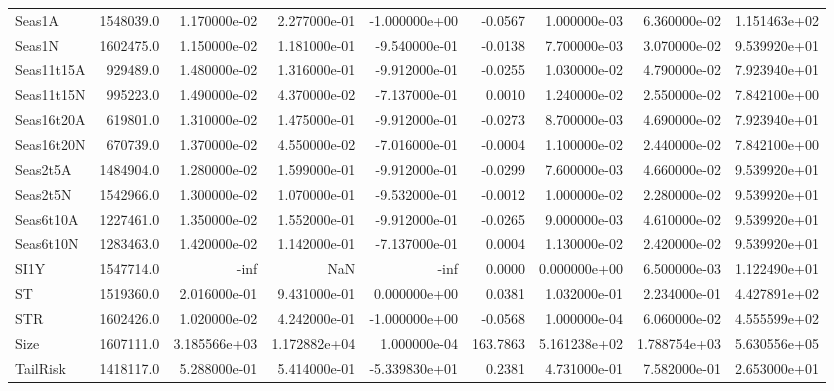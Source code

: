 \begin{tabular}{lrrrrrrrr}
Seas1A     &  1548039.0 &  1.170000e-02 &  2.277000e-01 & -1.000000e+00 &      -0.0567 &  1.000000e-03 &  6.360000e-02 &  1.151463e+02 \\
Seas1N     &  1602475.0 &  1.150000e-02 &  1.181000e-01 & -9.540000e-01 &      -0.0138 &  7.700000e-03 &  3.070000e-02 &  9.539920e+01 \\
Seas11t15A &   929489.0 &  1.480000e-02 &  1.316000e-01 & -9.912000e-01 &      -0.0255 &  1.030000e-02 &  4.790000e-02 &  7.923940e+01 \\
Seas11t15N &   995223.0 &  1.490000e-02 &  4.370000e-02 & -7.137000e-01 &       0.0010 &  1.240000e-02 &  2.550000e-02 &  7.842100e+00 \\
Seas16t20A &   619801.0 &  1.310000e-02 &  1.475000e-01 & -9.912000e-01 &      -0.0273 &  8.700000e-03 &  4.690000e-02 &  7.923940e+01 \\
Seas16t20N &   670739.0 &  1.370000e-02 &  4.550000e-02 & -7.016000e-01 &      -0.0004 &  1.100000e-02 &  2.440000e-02 &  7.842100e+00 \\
Seas2t5A   &  1484904.0 &  1.280000e-02 &  1.599000e-01 & -9.912000e-01 &      -0.0299 &  7.600000e-03 &  4.660000e-02 &  9.539920e+01 \\
Seas2t5N   &  1542966.0 &  1.300000e-02 &  1.070000e-01 & -9.532000e-01 &      -0.0012 &  1.000000e-02 &  2.280000e-02 &  9.539920e+01 \\
Seas6t10A  &  1227461.0 &  1.350000e-02 &  1.552000e-01 & -9.912000e-01 &      -0.0265 &  9.000000e-03 &  4.610000e-02 &  9.539920e+01 \\
Seas6t10N  &  1283463.0 &  1.420000e-02 &  1.142000e-01 & -7.137000e-01 &       0.0004 &  1.130000e-02 &  2.420000e-02 &  9.539920e+01 \\
SI1Y       &  1547714.0 &          -inf &           NaN &          -inf &       0.0000 &  0.000000e+00 &  6.500000e-03 &  1.122490e+01 \\
ST         &  1519360.0 &  2.016000e-01 &  9.431000e-01 &  0.000000e+00 &       0.0381 &  1.032000e-01 &  2.234000e-01 &  4.427891e+02 \\
STR        &  1602426.0 &  1.020000e-02 &  4.242000e-01 & -1.000000e+00 &      -0.0568 &  1.000000e-04 &  6.060000e-02 &  4.555599e+02 \\
Size       &  1607111.0 &  3.185566e+03 &  1.172882e+04 &  1.000000e-04 &     163.7863 &  5.161238e+02 &  1.788754e+03 &  5.630556e+05 \\
TailRisk   &  1418117.0 &  5.288000e-01 &  5.414000e-01 & -5.339830e+01 &       0.2381 &  4.731000e-01 &  7.582000e-01 &  2.653000e+01 \\

\end{tabular}

